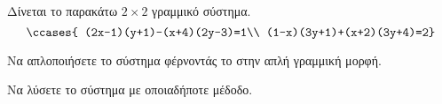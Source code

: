 Δίνεται το παρακάτω $ 2\times2 $ γραμμικό σύστημα.
\[ \ccases{
(2x-1)(y+1)-(x+4)(2y-3)=1\\
(1-x)(3y+1)+(x+2)(3y+4)=2} \]
\begin{rlist}
\item Να απλοποιήσετε το σύστημα φέρνοντάς το στην απλή γραμμική μορφή.
\item Να λύσετε το σύστημα με οποιαδήποτε μέδοδο.
\end{rlist}